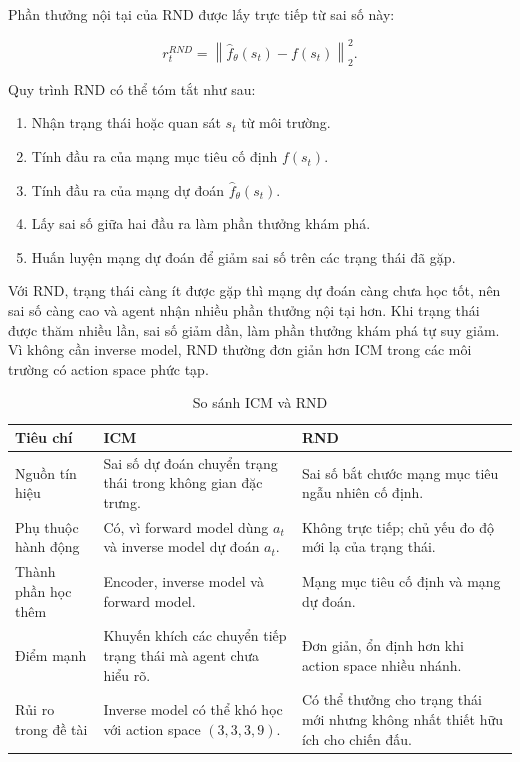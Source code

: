 Phần thưởng nội tại của RND được lấy trực tiếp từ sai số này:

\begin{equation}
    r_t^{RND} =
    \left\|
    \hat{f}_{\theta}(s_t) - f(s_t)
    \right\|_2^2.
\end{equation}

Quy trình RND có thể tóm tắt như sau:

\begin{enumerate}
    \item Nhận trạng thái hoặc quan sát $s_t$ từ môi trường.
    \item Tính đầu ra của mạng mục tiêu cố định $f(s_t)$.
    \item Tính đầu ra của mạng dự đoán $\hat{f}_{\theta}(s_t)$.
    \item Lấy sai số giữa hai đầu ra làm phần thưởng khám phá.
    \item Huấn luyện mạng dự đoán để giảm sai số trên các trạng thái đã gặp.
\end{enumerate}

Với RND, trạng thái càng ít được gặp thì mạng dự đoán càng chưa học tốt, nên sai số càng cao và agent nhận nhiều phần thưởng nội tại hơn. Khi trạng thái được thăm nhiều lần, sai số giảm dần, làm phần thưởng khám phá tự suy giảm. Vì không cần inverse model, RND thường đơn giản hơn ICM trong các môi trường có action space phức tạp.

\begin{table}[H]
    \centering
    \small
    \caption{So sánh ICM và RND}
    \label{tab:icm_rnd_compare}
    \begin{tabular}{|p{3.1cm}|p{5.0cm}|p{5.0cm}|}
        \hline
        \textbf{Tiêu chí} & \textbf{ICM} & \textbf{RND} \\
        \hline
        Nguồn tín hiệu & Sai số dự đoán chuyển trạng thái trong không gian đặc trưng. & Sai số bắt chước mạng mục tiêu ngẫu nhiên cố định. \\
        \hline
        Phụ thuộc hành động & Có, vì forward model dùng $a_t$ và inverse model dự đoán $a_t$. & Không trực tiếp; chủ yếu đo độ mới lạ của trạng thái. \\
        \hline
        Thành phần học thêm & Encoder, inverse model và forward model. & Mạng mục tiêu cố định và mạng dự đoán. \\
        \hline
        Điểm mạnh & Khuyến khích các chuyển tiếp trạng thái mà agent chưa hiểu rõ. & Đơn giản, ổn định hơn khi action space nhiều nhánh. \\
        \hline
        Rủi ro trong đề tài & Inverse model có thể khó học với action space $(3,3,3,9)$. & Có thể thưởng cho trạng thái mới nhưng không nhất thiết hữu ích cho chiến đấu. \\
        \hline
    \end{tabular}
\end{table}

